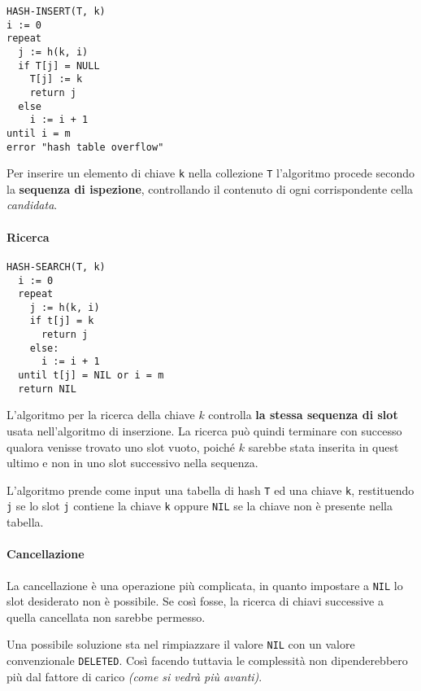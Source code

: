 \documentclass[italian, 10pt]{article}
\begin{document}
\begin{lstlisting}[style=pseudocode, caption={Pseudocodice dell'algoritmo \texttt{HASH-INSERT}}, label={sec:inserimento-ind-aperto}]
HASH-INSERT(T, k)
i := 0
repeat
  j := h(k, i)
  if T[j] = NULL
    T[j] := k
    return j
  else
    i := i + 1
until i = m
error "hash table overflow"
\end{lstlisting}

Per inserire un elemento di chiave \texttt{k} nella collezione \texttt{T} l'algoritmo procede secondo la \textbf{sequenza di ispezione}, controllando il contenuto di ogni corrispondente cella \textit{candidata}.

\paragraph{Ricerca}

\begin{lstlisting}[style=pseudocode, caption={Pseudocodice dell'algoritmo \texttt{HASH-SEARCH}}, label={sec:ricerca-ind-aperto}]
HASH-SEARCH(T, k)
  i := 0
  repeat
    j := h(k, i)
    if t[j] = k
      return j
    else:
      i := i + 1
  until t[j] = NIL or i = m
  return NIL
\end{lstlisting}

L'algoritmo per la ricerca della chiave \(k\) controlla \textbf{la stessa sequenza di slot} usata nell'algoritmo di inserzione.
La ricerca può quindi terminare con successo qualora venisse trovato uno slot vuoto, poiché \(k\) sarebbe stata inserita in quest ultimo e non in uno slot successivo nella sequenza.

L'algoritmo prende come input una tabella di hash \texttt{T} ed una chiave \texttt{k}, restituendo \texttt{j} se lo slot \texttt{j} contiene la chiave \texttt{k} oppure \texttt{NIL} se la chiave non è presente nella tabella.

\paragraph{Cancellazione}

La cancellazione è una operazione più complicata, in quanto impostare a \texttt{NIL} lo slot desiderato non è possibile.
Se così fosse, la ricerca di chiavi successive a quella cancellata non sarebbe permesso.

Una possibile soluzione sta nel rimpiazzare il valore \texttt{NIL} con un valore convenzionale \texttt{DELETED}.
Così facendo tuttavia le complessità non dipenderebbero più dal fattore di carico \textit{(come si vedrà più avanti)}.
\end{document}
